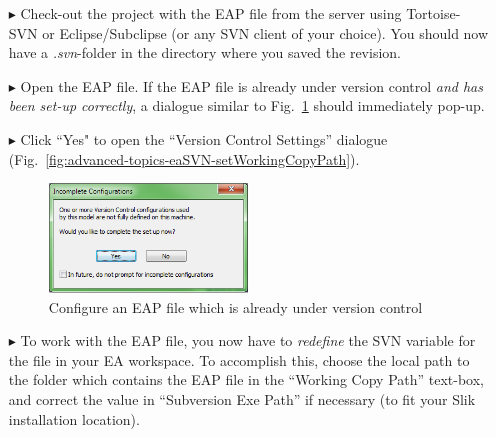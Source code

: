 \begin{enumerate}
  \item[$\blacktriangleright$] Check-out the project with the EAP file from the server using Tortoise-SVN or Eclipse/Subclipse (or any SVN client of your
  choice). You should now have a \textit{.svn}-folder in the directory where you saved the revision.
  \item[$\blacktriangleright$] Open the EAP file. If the EAP file is already under version control \emph{and has been set-up correctly}, a dialogue similar to
  Fig.~\ref{fig:advanced-topics-eaSVN-incompleteConf} should immediately pop-up.
  \item[$\blacktriangleright$] Click ``Yes" to open the ``Version Control Settings'' dialogue (Fig.~\ref{fig:advanced-topics-eaSVN-setWorkingCopyPath}).

\begin{figure}[!htbp]
\begin{center}
	\includegraphics[width=0.5\textwidth]{011}
	\caption{Configure an EAP file which is already under version control}
  	\label{fig:advanced-topics-eaSVN-incompleteConf}
\end{center}
\end{figure}

   \item[$\blacktriangleright$] To work with the EAP file, you now have to \emph{redefine} the SVN variable for the file in your EA workspace.
   To accomplish this, choose the local path to the folder which contains the EAP file in the ``Working Copy Path'' text-box, and correct the value in
   ``Subversion Exe Path'' if necessary (to fit your Slik installation location).


\end{enumerate}

